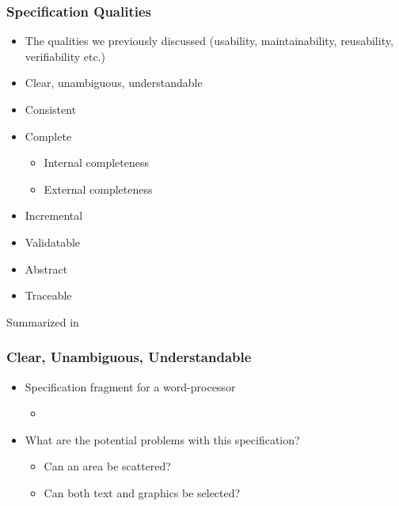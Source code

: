 \documentclass[t,12pt,numbers,fleqn]{beamer}
\begin{document}
\begin{frame}
\frametitle{Specification Qualities}

\begin{itemize}
\item The qualities we previously discussed (usability, maintainability,
  reusability, verifiability etc.)
\item Clear, unambiguous,  understandable
\item Consistent
\item Complete
\begin{itemize}
\item Internal completeness
\item External completeness
\end{itemize}
\item Incremental
\item Validatable
\item Abstract
\item Traceable
\end{itemize}

Summarized in \cite[p.\ 406]{SmithAndKoothoor2016}

\end{frame}


\begin{frame}
\frametitle{Clear, Unambiguous, Understandable}

\begin{itemize}

\item Specification fragment for a word-processor
\begin{itemize}
\item {}
\end{itemize}
\item What are the potential problems with this specification?
\begin{itemize}
\item<2-> {\alert{Can an area be scattered?}}
\item<2->{\alert{Can both text and graphics be selected?}}
\end{itemize}
\end{itemize}

\end{frame}
\end{document}
